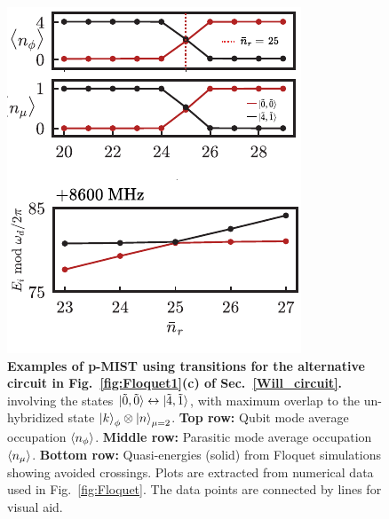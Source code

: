 \documentclass[%
reprint,
superscriptaddress,
 amsmath,amssymb,
 aps,
 prx,
longbibliography,
floatfix,
]{revtex4-2}
\begin{document}
 \begin{figure}[htb]
    \centering
    \includegraphics[width=\linewidth]{Supp_Fig/Floquet_Will_landscape.pdf}
    \caption{{\bf Examples of p-MIST using transitions for the alternative circuit in Fig.~\ref{fig:Floquet1}(c) of Sec.~\ref{Will_circuit}.} involving the states $\ket{\tilde{0},\tilde{0}}\leftrightarrow\ket{\tilde{4},\tilde{1}}$, with maximum overlap to the un-hybridized state $\ket{k}_\phi\otimes\ket{n}_{\mu=2}$. \textbf{Top row:} Qubit mode average occupation $\braket{n_\phi}$. \textbf{Middle row:} Parasitic mode average occupation $\braket{n_\mu}$. \textbf{Bottom row:} Quasi-energies (solid) from Floquet simulations showing avoided crossings. Plots are extracted from numerical data used in Fig.~\ref{fig:Floquet}. The data points are connected by lines for visual aid.}
    \label{fig:011_Will}
\end{figure}
\end{document}
